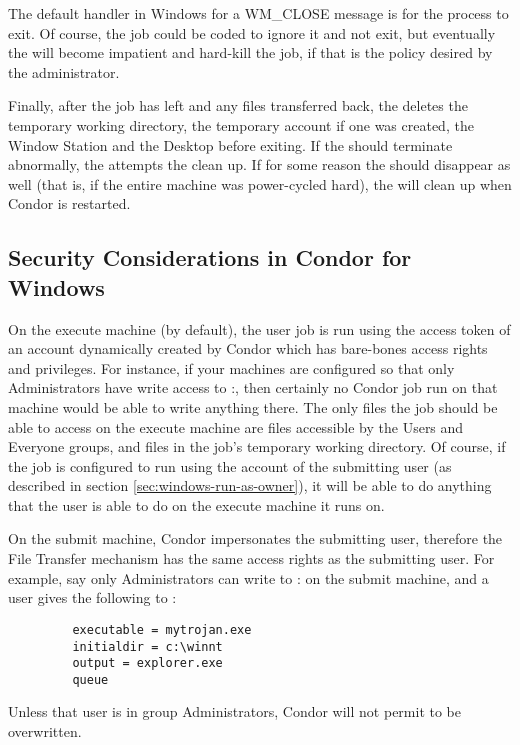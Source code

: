\Note The default handler in Windows for a WM\_CLOSE message is for the
process to exit.  Of course, the job could be coded to ignore it and not
exit, but eventually the  will become impatient and hard-kill
the job, if that is the policy desired by the administrator.

Finally, after the job has left and any files transferred back, 
the  deletes the temporary working directory, 
the temporary account if one was created,
the Window Station and the Desktop before exiting. 
If the  should terminate abnormally, 
the  attempts the clean up.  
If for some reason the  should disappear as well
(that is, if the entire machine was power-cycled hard),
the  will clean up when Condor is restarted.

\subsection{Security Considerations in Condor for Windows}


On the execute machine (by default), the user job is run using the
access token of an account dynamically created by Condor which has
bare-bones access rights and privileges.  For instance, if your
machines are configured so that only Administrators have write access
to
\verb@C:\WINNT@, then certainly no Condor job run on that machine
would be able to write anything there.  The only files the job should
be able to access on the execute machine are files accessible by the
Users and Everyone groups, and files in the job's temporary working
directory.  Of course, if the job is configured to run using the
account of the submitting user (as described in section
\ref{sec:windows-run-as-owner}), it will be able to do anything that
the user is able to do on the execute machine it runs on.

On the submit machine, Condor impersonates the submitting user, therefore
the File Transfer mechanism has the same access rights as the submitting
user.  For example, say only Administrators can write to
\verb@C:\WINNT@
on the submit machine,
and a user gives the following to  :
\begin{verbatim}
         executable = mytrojan.exe
         initialdir = c:\winnt
         output = explorer.exe
         queue
\end{verbatim}
Unless that user is in group Administrators, Condor will not permit
 to be overwritten.  

